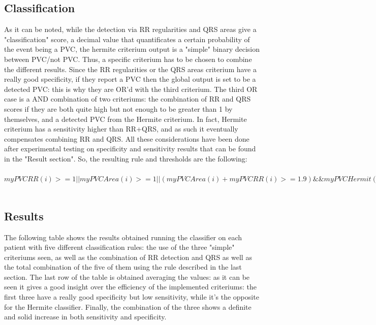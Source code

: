 \documentclass[a4paper,titlepage]{article}
\begin{document}
\subsection{Classification}
As it can be noted, while the detection via RR regularities and QRS areas give a "classification" score, a decimal value that quantificates a certain probability of the event being a PVC, the hermite criterium output is a "simple" binary decision between PVC/not PVC. Thus, a specific criterium has to be chosen to combine the different results.
Since the RR regularities or the QRS areas criterium have a really good specificity, if they report a PVC then the global output is set to be a detected PVC: this is why they are OR'd with the third criterium. The third OR case is a AND combination of two criteriums: the combination of RR and QRS scores if they are both quite high but not enough to be greater than 1 by themselves, and a detected PVC from the Hermite criterium. In fact, Hermite criterium has a sensitivity higher than RR+QRS, and as such it eventually compensates combining RR and QRS.
All these considerations have been done after experimental testing on specificity and sensitivity results that can be found in the "Result section".
So, the resulting rule and thresholds are the following:\\\\
$myPVCRR(i) >= 1 || myPVCArea(i) >= 1 || (myPVCArea(i) + myPVCRR(i) >= 1.9) \&\& myPVCHermit(i) == 1$
\\\\

\subsection{Results}

The following table shows the results obtained running the classifier on each patient with five different classification rules: the use of the three "simple" criteriums seen, as well as the combination of RR detection and QRS as well as the total combination of the five of them using the rule described in the last section.
The last row of the table is obtained averaging the values: as it can be seen it gives a good insight over the efficiency of the implemented criteriums: the first three have a really good specificity but low sensitivity, while it's the opposite for the Hermite classifier. Finally, the combination of the three shows a definite and solid increase in both sensitivity and specificity.
\\
\end{document}
